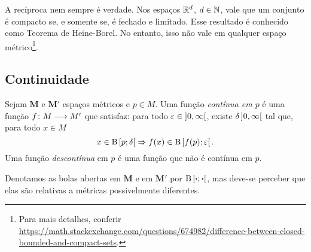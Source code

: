 A recíproca nem sempre é verdade. Nos espaços $\mathbb{R}^d$, $ d \in \mathbb{N}$, vale que um conjunto é compacto se, e somente se, é fechado e limitado. Esse resultado é conhecido como Teorema de Heine-Borel. No entanto, isso não vale em qualquer espaço métrico\footnote{Para mais detalhes, conferir \url{https://math.stackexchange.com/questions/674982/difference-between-closed-bounded-and-compact-sets}.}.

\subsection{Continuidade}

\begin{definition}
Sejam $\bm M$ e $\bm M'$ espaços métricos e $p \in M$. Uma função \emph{contínua em $p$} é uma função ${f}\colon {M} \longrightarrow {M'}$ que satisfaz: para todo $\varepsilon \in \left]{0},{\infty}\right[$, existe $\delta \left]{0},{\infty}\right[$ tal que, para todo $x \in M$
	\begin{equation*}
	x \in \mathrm{B}\left[{p};{\delta}\right[ \Rightarrow f(x) \in \mathrm{B}\left[{f(p)};{\varepsilon}\right[.
	\end{equation*}
Uma função \emph{descontínua} em $p$ é uma função que não é contínua em $p$.
\end{definition}

Denotamos as bolas abertas em $\bm M$ e em $\bm M'$ por $\mathrm{B}\left[{\bm{\cdot}};{\bm{\cdot}}\right[$, mas deve-se perceber que elas são relativas a métricas possivelmente diferentes.

